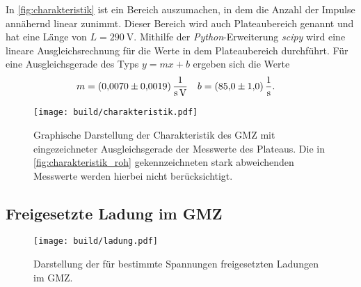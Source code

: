 In \autoref{fig:charakteristik} ist ein Bereich auszumachen, in dem die Anzahl der Impulse annähernd linear
zunimmt. Dieser Bereich wird auch Plateaubereich genannt und hat eine Länge von $L=\qty{290}{\volt}$. Mithilfe der \textit{Python}-Erweiterung \textit{scipy} \cite{scipy} wird eine lineare Ausgleichsrechnung
für die Werte in dem Plateaubereich durchführt. Für eine Ausgleichsgerade des Typs $y=mx + b$ ergeben sich die
Werte
\begin{align*}
    m &= \qty{0.0070+-0.0019}{\per\second\per\volt} & b &= \qty{85.0+-1.0}{\per\second}.
\end{align*}

\begin{figure}
    \centering
    \texttt{[image: build/charakteristik.pdf]}
    \caption{Graphische Darstellung der Charakteristik des GMZ mit eingezeichneter Ausgleichsgerade der %
    Messwerte des Plateaus. Die in \autoref{fig:charakteristik_roh} gekennzeichneten stark abweichenden %
    Messwerte werden hierbei nicht berücksichtigt.}
    \label{fig:charakteristik}
\end{figure}





\subsection{Freigesetzte Ladung im GMZ}



\begin{figure}[H]
    \centering
    \texttt{[image: build/ladung.pdf]}
    \caption{Darstellung der für bestimmte Spannungen freigesetzten Ladungen im GMZ.}
    \label{fig:ladung}
\end{figure}